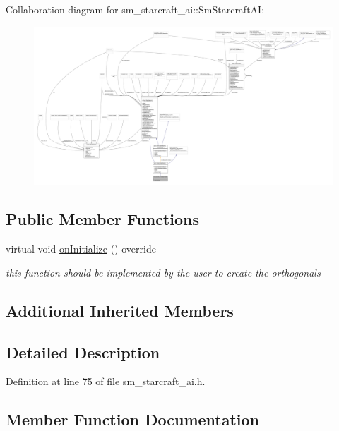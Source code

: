 Collaboration diagram for sm\+\_\+starcraft\+\_\+ai\+:\+:Sm\+Starcraft\+AI\+:
\nopagebreak
\begin{figure}[H]
\begin{center}
\leavevmode
\includegraphics[width=350pt]{structsm__starcraft__ai_1_1SmStarcraftAI__coll__graph}
\end{center}
\end{figure}
\subsection*{Public Member Functions}
\begin{DoxyCompactItemize}
\item 
virtual void \hyperlink{structsm__starcraft__ai_1_1SmStarcraftAI_a16d8896df860ce9098a7eb7ccce90a4c}{on\+Initialize} () override
\begin{DoxyCompactList}\small\item\em this function should be implemented by the user to create the orthogonals \end{DoxyCompactList}\end{DoxyCompactItemize}
\subsection*{Additional Inherited Members}


\subsection{Detailed Description}


Definition at line 75 of file sm\+\_\+starcraft\+\_\+ai.\+h.



\subsection{Member Function Documentation}
\mbox{\label{structsm__starcraft__ai_1_1SmStarcraftAI_a16d8896df860ce9098a7eb7ccce90a4c}} 
